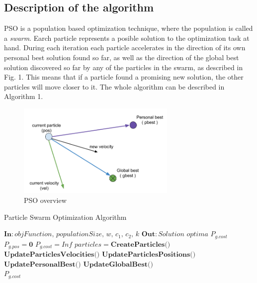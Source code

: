 \documentclass[journal]{IEEEtran}
\begin{document}
\subsection{ Description of the algorithm }
PSO is a population based optimization technique, where the population is called a \textit{swarm}. Earch particle represents a posible solution to the optimization task at hand. During each iteration each particle accelerates in the direction of its own personal best solution found so far, as well as the direction of the global best solution discovered so far by any of the particles in the swarm, as described in Fig. 1. This means that if a particle found a promising new solution, the other particles will move closer to it. The whole algorithm can be described in Algorithm 1.
\\
\begin{figure}[H]
\centering
\includegraphics[width=3.0in]{_img/img_PSO_overview.png}
\caption{PSO overview}
\end{figure}

\begin{algorithm}
    \caption{Particle Swarm Optimization Algorithm}\label{alg:PSOpseudocode}
    \begin{algorithmic}[1]
        \State $\textbf{In}: \textit{objFunction, populationSize, w, $c_{1}$, $c_{2}$, k}$
        \State $\textbf{Out}: \textit{Solution optima } P_{g.cost}$
        \State $P_{g.pos} = \textbf{0}$
        \State $P_{g.cost} = Inf$
        \State $particles = \textbf{CreateParticles()}$
                \State $\textbf{UpdateParticlesVelocities()}$
                \State $\textbf{UpdateParticlesPositions()}$
                \State $\textbf{UpdatePersonalBest()}$
                \State $\textbf{UpdateGlobalBest()}$
            \EndFor
        \EndWhile
        \\
        \Return $P_{g.cost}$
    \end{algorithmic}
\end{algorithm}
\end{document}
